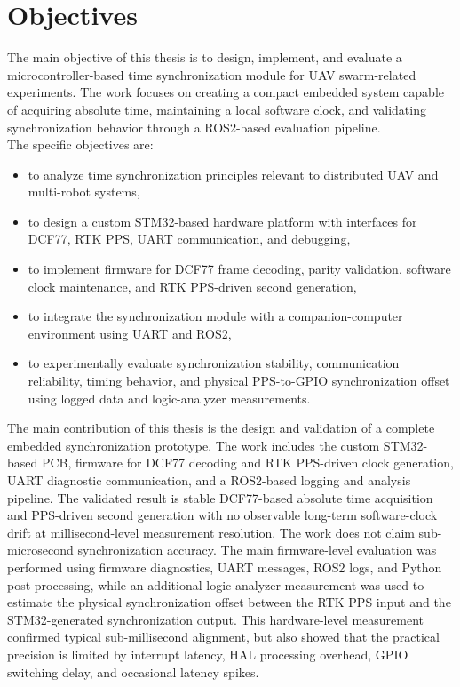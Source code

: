 \section{Objectives}

The main objective of this thesis is to design, implement, and evaluate a microcontroller-based time synchronization module for UAV swarm-related experiments. The work focuses on creating a compact embedded system capable of acquiring absolute time, maintaining a local software clock, and validating synchronization behavior through a ROS2-based evaluation pipeline.
\\
The specific objectives are:
\begin{itemize}
    \item to analyze time synchronization principles relevant to distributed UAV and multi-robot systems,
    \item to design a custom STM32-based hardware platform with interfaces for DCF77, RTK PPS, UART communication, and debugging,
    \item to implement firmware for DCF77 frame decoding, parity validation, software clock maintenance, and RTK PPS-driven second generation,
    \item to integrate the synchronization module with a companion-computer environment using UART and ROS2,
    \item to experimentally evaluate synchronization stability, communication reliability, timing behavior, and physical PPS-to-GPIO synchronization offset using logged data and logic-analyzer measurements.
\end{itemize}

The main contribution of this thesis is the design and validation of a complete embedded synchronization prototype. The work includes the custom STM32-based PCB, firmware for DCF77 decoding and RTK PPS-driven clock generation, UART diagnostic communication, and a ROS2-based logging and analysis pipeline. The validated result is stable DCF77-based absolute time acquisition and PPS-driven second generation with no observable long-term software-clock drift at millisecond-level measurement resolution. The work does not claim sub-microsecond synchronization accuracy. The main firmware-level evaluation was performed using firmware diagnostics, UART messages, ROS2 logs, and Python post-processing, while an additional logic-analyzer measurement was used to estimate the physical synchronization offset between the RTK PPS input and the STM32-generated synchronization output. This hardware-level measurement confirmed typical sub-millisecond alignment, but also showed that the practical precision is limited by interrupt latency, HAL processing overhead, GPIO switching delay, and occasional latency spikes.

